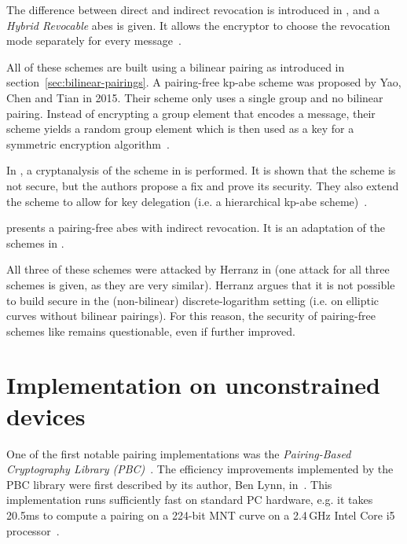 The difference between direct and indirect revocation is introduced in \cite{attrapadung_attribute-based_2009}, and a \emph{Hybrid Revocable} \acrshort{abes} is given.
It allows the encryptor to choose the revocation mode separately for every message~\cite{attrapadung_attribute-based_2009}.

All of these schemes are built using a bilinear pairing as introduced in section~\ref{sec:bilinear-pairings}.
A pairing-free \acrshort{kp-abe} scheme was proposed by Yao, Chen and Tian \cite{yao_lightweight_2015} in 2015.
Their scheme only uses a single group and no bilinear pairing.
Instead of encrypting a group element that encodes a message, their scheme yields a random group element which is then used as a key for a symmetric encryption algorithm~\cite{yao_lightweight_2015}.

In \cite{tan_enhancement_2019}, a cryptanalysis of the scheme in \cite{yao_lightweight_2015} is performed.
It is shown that the scheme is not secure, but the authors propose a fix and prove its security.
They also extend the scheme to allow for key delegation (i.e. a hierarchical \acrshort{kp-abe} scheme)~\cite{tan_enhancement_2019}.

\cite{sowjanya_efficient_2020} presents a pairing-free \acrshort{abes} with indirect revocation.
It is an adaptation of the schemes in \cite{yao_lightweight_2015,tan_enhancement_2019}.

All three of these schemes were attacked by Herranz in \cite{herranz_attacking_2020} (one attack for all three schemes is given, as they are very similar).
Herranz argues that it is not possible to build secure  in the (non-bilinear) discrete-logarithm setting (i.e. on elliptic curves without bilinear pairings).
For this reason, the security of pairing-free schemes like \cite{yao_lightweight_2015,sowjanya_efficient_2020,tan_enhancement_2019} remains questionable, even if further improved.

\section{Implementation on unconstrained devices}
One of the first notable pairing implementations was the \emph{Pairing-Based Cryptography Library (PBC)}~\cite{lynn_pairing-based_nodate, lynn_implementation_2007}.
The efficiency improvements implemented by the PBC library were first described by its author, Ben Lynn, in~\cite{lynn_implementation_2007}.
This implementation runs sufficiently fast on standard PC hardware, e.g. it takes 20.5ms to compute a pairing on a 224-bit MNT curve on a 2.4\,GHz Intel Core i5 processor~\cite{akinyele_self-protecting_2010}.


